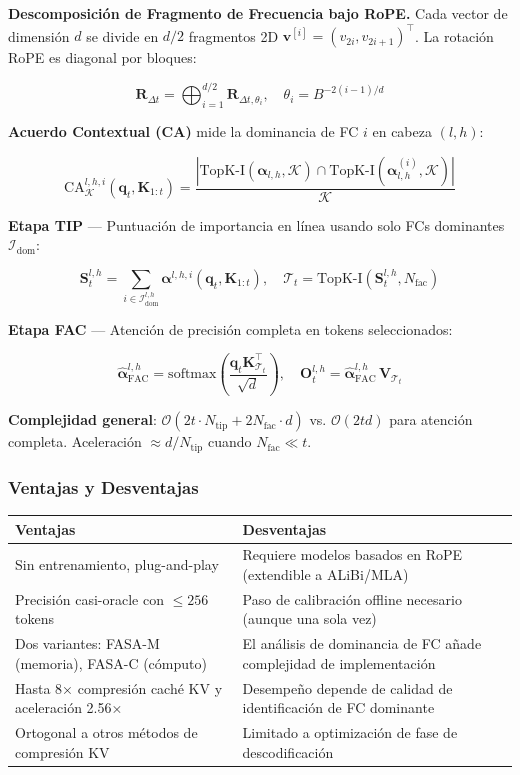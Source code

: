 \documentclass[11pt,a4paper]{article}
\begin{document}
\textbf{Descomposición de Fragmento de Frecuencia bajo RoPE.} Cada vector de dimensión $d$ se divide en $d/2$ fragmentos 2D $\mathbf{v}^{[i]} = (v_{2i}, v_{2i+1})^\top$. La rotación RoPE es diagonal por bloques:

$$
\mathbf{R}_{\Delta t} = \bigoplus_{i=1}^{d/2} \mathbf{R}_{\Delta t, \theta_i}, \quad \theta_i = B^{-2(i-1)/d}
$$

\textbf{Acuerdo Contextual (CA)} mide la dominancia de FC $i$ en cabeza $(l,h)$:

$$
\text{CA}_{\mathcal{K}}^{l,h,i}(\mathbf{q}_t, \mathbf{K}_{1:t}) = \frac{|\text{TopK-I}(\boldsymbol{\alpha}_{l,h}, \mathcal{K}) \cap \text{TopK-I}(\boldsymbol{\alpha}_{l,h}^{(i)}, \mathcal{K})|}{\mathcal{K}}
$$

\textbf{Etapa TIP} — Puntuación de importancia en línea usando solo FCs dominantes $\mathcal{I}_{\text{dom}}$:

$$
\mathbf{S}_t^{l,h} = \sum_{i \in \mathcal{I}_{\text{dom}}^{l,h}} \boldsymbol{\alpha}^{l,h,i}(\mathbf{q}_t, \mathbf{K}_{1:t}), \quad \mathcal{T}_t = \text{TopK-I}(\mathbf{S}_t^{l,h}, N_{\text{fac}})
$$

\textbf{Etapa FAC} — Atención de precisión completa en tokens seleccionados:

$$
\hat{\boldsymbol{\alpha}}_{\text{FAC}}^{l,h} = \text{softmax}\!\left(\frac{\mathbf{q}_t \mathbf{K}_{\mathcal{T}_t}^\top}{\sqrt{d}}\right), \quad \mathbf{O}_t^{l,h} = \hat{\boldsymbol{\alpha}}_{\text{FAC}}^{l,h} \, \mathbf{V}_{\mathcal{T}_t}
$$

\textbf{Complejidad general}: $\mathcal{O}(2t \cdot N_{\text{tip}} + 2 N_{\text{fac}} \cdot d)$ vs. $\mathcal{O}(2td)$ para atención completa. Aceleración $\approx d / N_{\text{tip}}$ cuando $N_{\text{fac}} \ll t$.

\subsubsection{Ventajas y Desventajas}

\begin{center}
{\small
\begin{tabular}{p{3.5cm}p{3.5cm}}
\toprule
\textbf{Ventajas} & \textbf{Desventajas} \\
\midrule
Sin entrenamiento, plug-and-play & Requiere modelos basados en RoPE (extendible a ALiBi/MLA) \\
Precisión casi-oracle con $\leq 256$ tokens & Paso de calibración offline necesario (aunque una sola vez) \\
Dos variantes: FASA-M (memoria), FASA-C (cómputo) & El análisis de dominancia de FC añade complejidad de implementación \\
Hasta 8× compresión caché KV y aceleración 2.56× & Desempeño depende de calidad de identificación de FC dominante \\
Ortogonal a otros métodos de compresión KV & Limitado a optimización de fase de descodificación \\
\bottomrule
\end{tabular}
}
\end{center}
\end{document}
